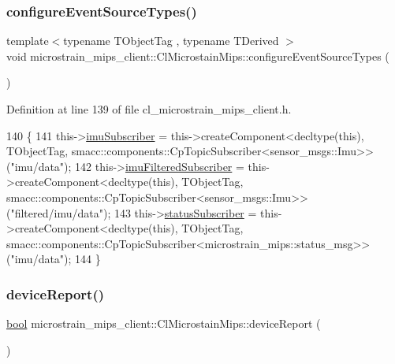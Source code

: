 \subsubsection{\texorpdfstring{configure\+Event\+Source\+Types()}{configureEventSourceTypes()}}
{\footnotesize\ttfamily template$<$typename T\+Object\+Tag , typename T\+Derived $>$ \\
void microstrain\+\_\+mips\+\_\+client\+::\+Cl\+Microstain\+Mips\+::configure\+Event\+Source\+Types (\begin{DoxyParamCaption}{ }\end{DoxyParamCaption})\hspace{0.3cm}{\ttfamily [inline]}}



Definition at line 139 of file cl\+\_\+microstrain\+\_\+mips\+\_\+client.\+h.


\begin{DoxyCode}
140     \{
141         this->\hyperlink{classmicrostrain__mips__client_1_1ClMicrostainMips_a1d1c48b4bb3c666e93b38f055f51d3dd}{imuSubscriber} = this->createComponent<decltype(this), TObjectTag,
       smacc::components::CpTopicSubscriber<sensor\_msgs::Imu>>(\textcolor{stringliteral}{"imu/data"});
142         this->\hyperlink{classmicrostrain__mips__client_1_1ClMicrostainMips_aab9328daa06d3a492582e8ade730dee3}{imuFilteredSubscriber} = this->createComponent<decltype(this),
       TObjectTag, smacc::components::CpTopicSubscriber<sensor\_msgs::Imu>>(\textcolor{stringliteral}{"filtered/imu/data"});
143         this->\hyperlink{classmicrostrain__mips__client_1_1ClMicrostainMips_ac35f8c095ccda178eb68bb94c705c024}{statusSubscriber} = this->createComponent<decltype(this), TObjectTag,
       smacc::components::CpTopicSubscriber<microstrain\_mips::status\_msg>>(\textcolor{stringliteral}{"imu/data"});
144     \}
\end{DoxyCode}
\mbox{\label{classmicrostrain__mips__client_1_1ClMicrostainMips_ae5375a32516d96d79397eaf8f4ad0303}} 
\subsubsection{\texorpdfstring{device\+Report()}{deviceReport()}}
{\footnotesize\ttfamily \hyperlink{classbool}{bool} microstrain\+\_\+mips\+\_\+client\+::\+Cl\+Microstain\+Mips\+::device\+Report (\begin{DoxyParamCaption}{ }\end{DoxyParamCaption})\hspace{0.3cm}{\ttfamily [inline]}}




